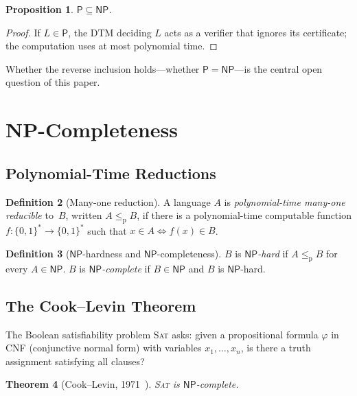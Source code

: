 \documentclass[12pt,a4paper]{amsart}
\newtheorem{theorem}{Theorem}[section]
\newtheorem{proposition}[theorem]{Proposition}
\theoremstyle{definition}
\newtheorem{definition}[theorem]{Definition}
\newcommand{\Pclass}{\mathsf{P}}
\newcommand{\NP}{\mathsf{NP}}
\newcommand{\SAT}{\textsc{Sat}}
\newcommand{\polyredu}{\leq_{\mathrm{p}}}
\begin{document}
\begin{proposition}
$\Pclass\subseteq\NP$.
\end{proposition}
\begin{proof}
If $L\in\Pclass$, the DTM deciding $L$ acts as a verifier that ignores its
certificate; the computation uses at most polynomial time.
\end{proof}

Whether the reverse inclusion holds---whether $\Pclass = \NP$---is the central
open question of this paper.

\section{NP-Completeness}
\label{sec:npc}

\subsection{Polynomial-Time Reductions}

\begin{definition}[Many-one reduction]
A language $A$ is \emph{polynomial-time many-one reducible} to~$B$, written
$A\polyredu B$, if there is a polynomial-time computable function
$f\colon\{0,1\}^*\to\{0,1\}^*$ such that $x\in A\iff f(x)\in B$.
\end{definition}

\begin{definition}[$\NP$-hardness and $\NP$-completeness]
$B$ is \emph{$\NP$-hard} if $A\polyredu B$ for every $A\in\NP$.
$B$ is \emph{$\NP$-complete} if $B\in\NP$ and $B$ is $\NP$-hard.
\end{definition}

\subsection{The Cook--Levin Theorem}

The Boolean satisfiability problem \SAT{} asks: given a propositional formula
$\varphi$ in CNF (conjunctive normal form) with variables $x_1,\ldots,x_n$, is
there a truth assignment satisfying all clauses?

\begin{theorem}[Cook--Levin, 1971~\cite{cook1971}]
\SAT{} is $\NP$-complete.
\end{theorem}
\end{document}
